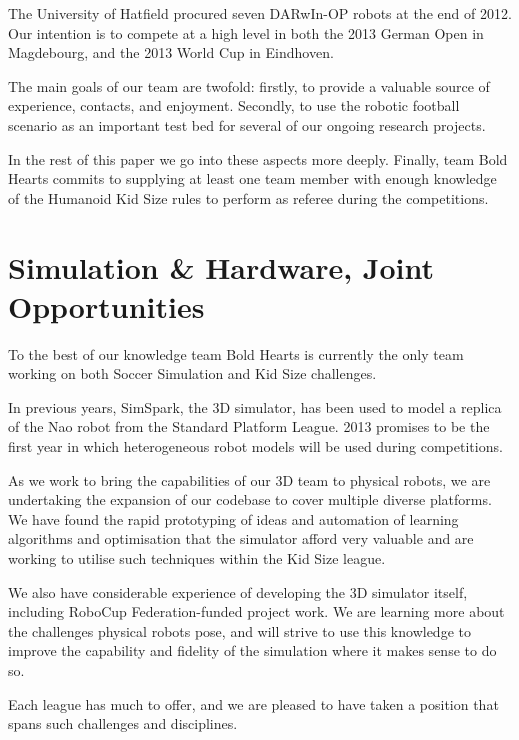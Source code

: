 \documentclass{llncs}
\begin{document}
The University of Hatfield procured seven DARwIn-OP robots at the end
of 2012. Our intention is to compete at a high level in both the 2013
German Open in Magdebourg, and the 2013 World Cup in Eindhoven.

The main goals of our team are twofold: firstly, to provide a
valuable source of experience, contacts, and enjoyment.
Secondly, to use the robotic football scenario as an important
test bed for several of our ongoing research projects.

In the rest of this paper we go into these aspects more
deeply. Finally, team Bold Hearts commits to supplying at least one
team member with enough knowledge of the Humanoid Kid Size rules to
perform as referee during the competitions.

\section{Simulation \& Hardware, Joint Opportunities}
\label{sec:simul-amp-hardw}

To the best of our knowledge team Bold Hearts is currently the only team
working on both Soccer Simulation and Kid Size challenges.

In previous years, SimSpark, the 3D simulator, has been used to model
a replica of the Nao robot from the Standard Platform League. 2013
promises to be the first year in which heterogeneous robot models
will be used during competitions.

As we work to bring the capabilities of our 3D team to physical robots,
we are undertaking the expansion of our codebase to cover multiple diverse platforms.
We have found the rapid prototyping of ideas and automation of learning algorithms and
optimisation that the simulator afford very valuable and are working
to utilise such techniques within the Kid Size league.

We also have considerable experience of developing the
3D simulator itself, including RoboCup Federation-funded
project work. We are learning more about the challenges physical
robots pose, and will strive to use this knowledge to improve the
capability and fidelity of the simulation where it makes sense to do so.

Each league has much to offer, and we are pleased to have taken a
position that spans such challenges and disciplines.

\end{document}
